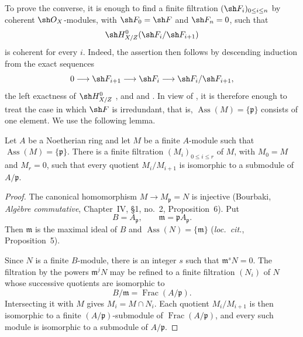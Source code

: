 To prove the converse, it is enough to find a finite filtration
$(\sh F_i)_{0\leq i\leq n}$ by coherent $\sh O_X$-modules, with
$\sh F_0=\sh F$ and $\sh F_n=0$, such that
\[
  \sh H^0_{X/Z}(\sh F_i/\sh F_{i+1})
\]
is coherent for every $i$.  Indeed, the assertion then follows by
descending induction from the exact sequences
\[
  0\longrightarrow\sh F_{i+1}\longrightarrow\sh F_i
  \longrightarrow\sh F_i/\sh F_{i+1},
\]
the left exactness of $\sh H^0_{X/Z}$ , and
 and .  In view of
, it is therefore enough to treat the case in which
$\sh F$ is irredundant, that is,
$\operatorname{Ass}(M)=\{\mathfrak p\}$ consists of one element.
We use the following lemma.

\begin{lemma}[5.11.1.1]
\label{IV.5.11.1.1}
Let $A$ be a Noetherian ring and let $M$ be a finite $A$-module
such that $\operatorname{Ass}(M)=\{\mathfrak p\}$.  There is a
finite filtration $(M_i)_{0\leq i\leq r}$ of $M$, with
$M_0=M$ and $M_r=0$, such that every quotient
$M_i/M_{i+1}$ is isomorphic to a submodule of $A/\mathfrak p$.
\end{lemma}

\begin{proof}
The canonical homomorphism
$M\to M_{\mathfrak p}=N$ is injective
(Bourbaki, \emph{Alg\`ebre commutative}, Chapter~IV,
\S1, no.~2, Proposition~6).  Put
\[
  B=A_{\mathfrak p},
  \qquad
  \mathfrak m=\mathfrak pA_{\mathfrak p}.
\]
Then $\mathfrak m$ is the maximal ideal of $B$ and
$\operatorname{Ass}(N)=\{\mathfrak m\}$
(\emph{loc.\ cit.}, Proposition~5).


Since $N$ is a finite
$B$-module, there is an integer $s$ such that
$\mathfrak m^sN=0$.  The filtration by the powers
$\mathfrak m^jN$ may be refined to a finite filtration
$(N_i)$ of $N$ whose successive quotients are isomorphic to
\[
  B/\mathfrak m=\operatorname{Frac}(A/\mathfrak p).
\]
Intersecting it with $M$ gives $M_i=M\cap N_i$.  Each quotient
$M_i/M_{i+1}$ is then isomorphic to a finite
$(A/\mathfrak p)$-submodule of
$\operatorname{Frac}(A/\mathfrak p)$, and every such module is
isomorphic to a submodule of $A/\mathfrak p$.
\end{proof}

